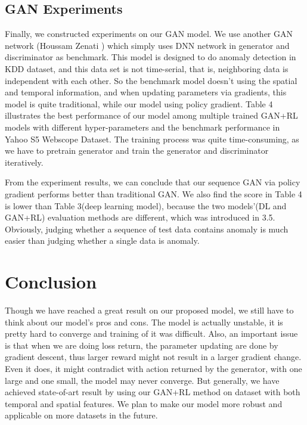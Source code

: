 \documentclass{acmtog} %
\begin{document}
\subsection{GAN Experiments}
Finally, we constructed experiments on our GAN model. We use another GAN network (Houssam Zenati \cite{bibitem1}) which simply uses DNN network in generator and discriminator as benchmark. This model is designed to do anomaly detection in KDD dataset, and this data set is not time-serial, that is, neighboring data is independent with each other. So the benchmark model doesn't using the spatial and temporal information, and when updating parameters via gradients, this model is quite traditional, while our model using policy gradient. Table 4 illustrates the best performance of our model among multiple trained GAN+RL models with different hyper-parameters and the benchmark performance in Yahoo S5 Webscope Dataset. The training process was quite time-consuming, as we have to pretrain generator and train the generator and discriminator iteratively.

\begin{table}[h]
\end{table}

From the experiment results, we can conclude that our sequence GAN via policy gradient performs better than traditional GAN. We also find the score in Table 4 is lower than Table 3(deep learning model), because the two models'(DL and GAN+RL) evaluation methods are different, which was introduced in 3.5. Obviously, judging whether a sequence of test data contains anomaly is much easier than judging whether a single data is anomaly.

\section{Conclusion}
Though we have reached a great result on our proposed model, we still have to think about our model's pros and cons. The model is actually unstable, it is pretty hard to converge and training of it was difficult. Also, an important issue is that when we are doing loss return, the parameter updating are done by gradient descent, thus larger reward might not result in a larger gradient change. Even it does, it might contradict with action returned by the generator, with one large and one small, the model may never converge. But generally, we have achieved state-of-art result by using our GAN+RL method on dataset with both temporal and spatial features. We plan to make our model more robust and applicable on more datasets in the future.
\end{document}
